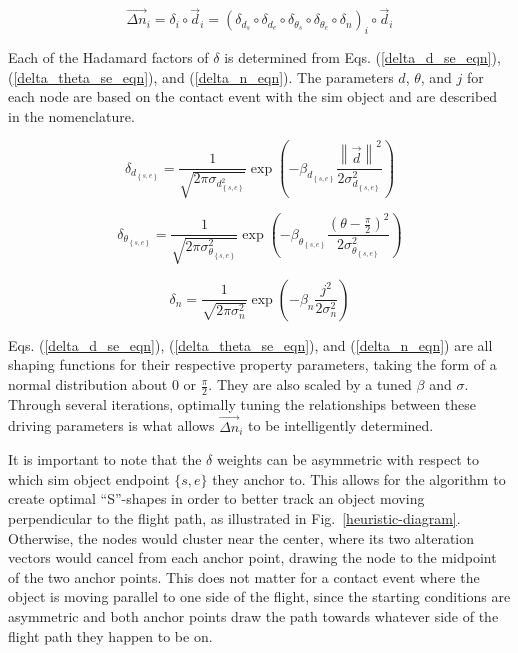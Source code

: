 \documentclass[conf]{new-aiaa}
\begin{document}
\begin{equation}
\label{change_vector_eqn}
\vec{{\Delta}{n}}_i = {{\delta}}_i\circ{\vec{d}}_i = \left({{\delta}_{d_s}}\circ{{\delta}_{d_e}}\circ{{\delta}_{\theta_s}}\circ{{\delta}_{\theta_e}}\circ{{\delta}_n}\right)_i\circ{\vec{d}}_i
\end{equation}

Each of the Hadamard factors of $\delta$ is determined from Eqs. (\ref{delta_d_se_eqn}), (\ref{delta_theta_se_eqn}), and (\ref{delta_n_eqn}). The parameters $d$, $\theta$, and $j$ for each node are based on the contact event with the sim object and are described in the nomenclature.

\begin{equation}
\label{delta_d_se_eqn}
\delta_{d_{\left\{s,e\right\}}} = \frac{1}{\sqrt{2\pi\sigma_{d_{\left\{s,e\right\}}^2}}}\exp\left({-\beta_{d_{\left\{s,e\right\}}}\frac{\left\|\vec{d}\right\|^2}{2\sigma_{d_{\left\{s,e\right\}}}^2}}\right)
\end{equation}

\begin{equation}
\label{delta_theta_se_eqn}
\delta_{\theta_{\left\{s,e\right\}}} = \frac{1}{\sqrt{2\pi\sigma_{\theta_{\left\{s,e\right\}}}^2}}\exp\left({-\beta_{\theta_{\left\{s,e\right\}}}\frac{{\left(\theta - \frac{\pi}{2}\right)}^2}{2\sigma_{\theta_{\left\{s,e\right\}}}^2}}\right)
\end{equation}

\begin{equation}
\label{delta_n_eqn}
\delta_n = \frac{1}{\sqrt{2\pi\sigma_n^2}}\exp\left({-\beta_n\frac{j^2}{2\sigma_n^2}}\right)
\end{equation}

Eqs. (\ref{delta_d_se_eqn}), (\ref{delta_theta_se_eqn}), and (\ref{delta_n_eqn}) are all shaping functions for their respective property parameters, taking the form of a normal distribution about $0$ or $\frac{\pi}{2}$. They are also scaled by a tuned $\beta$ and $\sigma$. Through several iterations, optimally tuning the relationships between these driving parameters is what allows $\vec{{\Delta}{n}}_i$ to be intelligently determined.

It is important to note that the $\delta$ weights can be asymmetric with respect to which sim object endpoint $\{s,e\}$ they anchor to. This allows for the algorithm to create optimal ``S''-shapes in order to better track an object moving perpendicular to the flight path, as illustrated in Fig.~\ref{heuristic-diagram}. Otherwise, the nodes would cluster near the center, where its two alteration vectors would cancel from each anchor point, drawing the node to the midpoint of the two anchor points. This does not matter for a contact event where the object is moving parallel to one side of the flight, since the starting conditions are asymmetric and both anchor points draw the path towards whatever side of the flight path they happen to be on.
\end{document}
